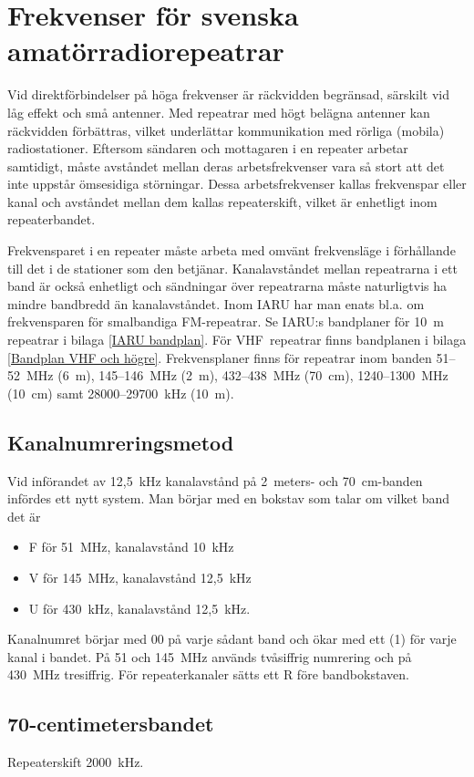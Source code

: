\chapter[Svenska repeatrar]{Frekvenser för svenska amatörradiorepeatrar}
\label{svenska repeatrar}

Vid direktförbindelser på höga frekvenser är räckvidden begränsad,
särskilt vid låg effekt och små antenner.
Med repeatrar med högt belägna antenner kan räckvidden förbättras,
vilket underlättar kommunikation med rörliga (mobila) radiostationer.
Eftersom sändaren och mottagaren i en repeater arbetar samtidigt, måste
avståndet mellan deras arbetsfrekvenser vara så stort att det inte uppstår
ömsesidiga störningar.
Dessa arbetsfrekvenser kallas frekvenspar eller kanal och avståndet mellan dem
kallas repeaterskift, vilket är enhetligt inom repeaterbandet.

Frekvensparet i en repeater måste arbeta med omvänt frekvensläge i förhållande
till det i de stationer som den betjänar.
Kanalavståndet mellan repeatrarna i ett band är också enhetligt och sändningar
över repeatrarna måste naturligtvis ha mindre bandbredd än kanalavståndet.
Inom IARU har man enats bl.a. om frekvensparen för smalbandiga FM-repeatrar.
Se IARU:s bandplaner för 10~m repeatrar i bilaga \ref{IARU bandplan}.
För VHF~repeatrar finns bandplanen i bilaga \ref{Bandplan VHF och högre}.
Frekvensplaner finns för repeatrar inom banden 51--52~MHz (6~m), 145--146~MHz
(2~m), 432--438~MHz (70~cm), 1240--1300~MHz (10~cm) samt 28000--29700~kHz (10~m).

\section{Kanalnumreringsmetod}
Vid införandet av 12,5~kHz kanalavstånd på 2~meters- och 70~cm-banden infördes
ett nytt system.
Man börjar med en bokstav som talar om vilket band det är
\begin{itemize}
  \item F för 51~MHz, kanalavstånd 10~kHz
  \item V för 145~MHz, kanalavstånd 12,5~kHz
  \item U för 430~kHz, kanalavstånd 12,5~kHz.
\end{itemize}
Kanalnumret börjar med 00 på varje sådant band och ökar med ett (1) för varje
kanal i bandet.
På 51 och 145~MHz används tvåsiffrig numrering och på 430~MHz tresiffrig.
För repeaterkanaler sätts ett R före bandbokstaven.

\section{70-centimetersbandet}
Repeaterskift 2000~kHz.

